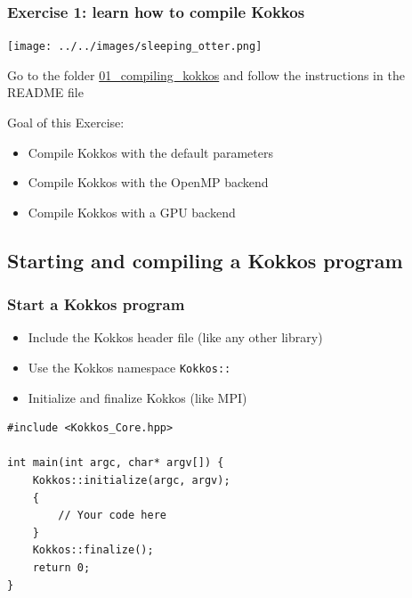\documentclass[aspectratio=169]{beamer}
\begin{document}
\begin{frame}[fragile]
    \frametitle{Exercise 1: learn how to compile Kokkos}

    \begin{center}
    \texttt{[image: ../../images/sleeping\_otter.png]}
    \end{center}

    Go to the folder \href{https://github.com/CExA-project/cexa-kokkos-tutorials/tree/main/exercises/01_compiling_kokkos}{01\_compiling\_kokkos} and follow the instructions in the README file

    Goal of this Exercise:
    \begin{itemize}
        \item Compile Kokkos with the default parameters
        \item Compile Kokkos with the OpenMP backend
        \item Compile Kokkos with a GPU backend
    \end{itemize}

\end{frame}


\subsection[Starting a Kokkos program]{Starting and compiling a Kokkos program}


\begin{frame}[fragile]
    \frametitle{Start a Kokkos program}
    \begin{itemize}
        \item Include the Kokkos header file (like any other library)
        \item Use the Kokkos namespace \texttt{Kokkos::}
        \item Initialize and finalize Kokkos (like MPI)
    \end{itemize}

\begin{verbatim}
#include <Kokkos_Core.hpp>

int main(int argc, char* argv[]) {
    Kokkos::initialize(argc, argv);
    {
        // Your code here
    }
    Kokkos::finalize();
    return 0;
}
\end{verbatim}

\end{frame}
\end{document}
